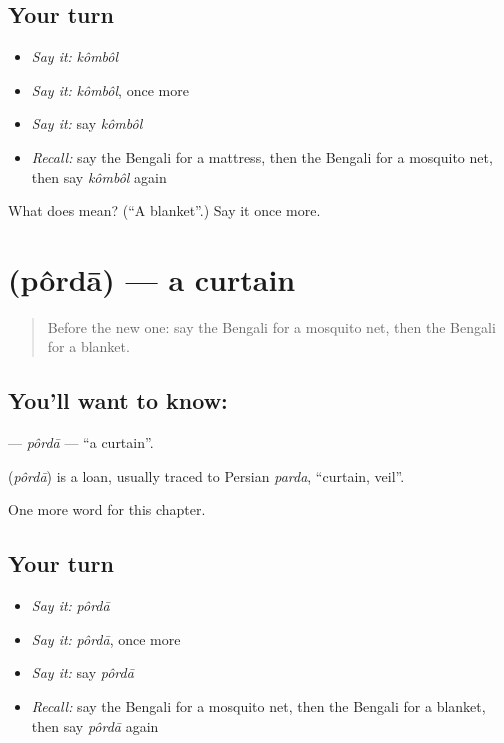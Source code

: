 \subsection*{Your turn}
\begin{itemize}
\raggedright
  \item \emph{Say it:} \emph{kômbôl}
  \item \emph{Say it:} \emph{kômbôl}, once more
  \item \emph{Say it:} say \emph{kômbôl}
  \item \emph{Recall:} say the Bengali for a mattress, then the Bengali for a mosquito net, then say \emph{kômbôl} again
\end{itemize}

\begin{tcolorbox}[breakable,colback=teal!4,colframe=teal!35!black,title={Before you move on}]
What does  mean? (\textquotedblleft{}A blanket\textquotedblright{}.) Say it once more.
\end{tcolorbox}
\section[\texorpdfstring{\bn{পর্দা} (pôrdā)}{পর্দা (pôrdā)}]{ (pôrdā) — a curtain}

\label{lesson:BN-C133-porda}



\begin{quote}
Before the new one: say the Bengali for a mosquito net, then the Bengali for a blanket.
\end{quote}

\subsection*{You'll want to know: }
\textbf{} — \emph{pôrdā} — \textquotedblleft{}a curtain\textquotedblright{}.

\begin{cousinweb}
\textbf{} (\emph{pôrdā}) is a loan, usually traced to Persian \emph{parda}, \textquotedblleft{}curtain, veil\textquotedblright{}.
\end{cousinweb}

\begin{grammarlens}[title={What you've built}]
One more word for this chapter.
\end{grammarlens}

\subsection*{Your turn}
\begin{itemize}
\raggedright
  \item \emph{Say it:} \emph{pôrdā}
  \item \emph{Say it:} \emph{pôrdā}, once more
  \item \emph{Say it:} say \emph{pôrdā}
  \item \emph{Recall:} say the Bengali for a mosquito net, then the Bengali for a blanket, then say \emph{pôrdā} again
\end{itemize}

